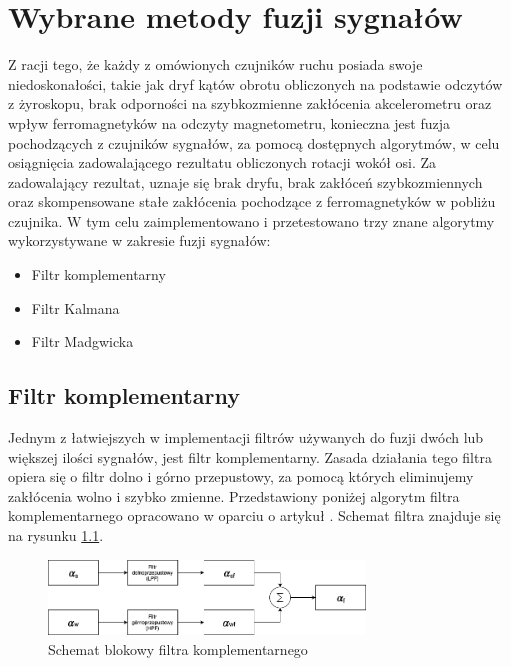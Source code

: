 \chapter{Wybrane metody fuzji sygnałów}
\label{chap:wybrane}

Z racji tego, że każdy z omówionych czujników ruchu posiada swoje niedoskonałości, takie jak dryf kątów obrotu obliczonych na podstawie odczytów z żyroskopu, brak odporności na szybkozmienne zakłócenia akcelerometru oraz wpływ ferromagnetyków na odczyty magnetometru, konieczna jest fuzja pochodzących z czujników sygnałów, za pomocą dostępnych algorytmów, w celu osiągnięcia zadowalającego rezultatu obliczonych rotacji wokół osi. Za zadowalający rezultat, uznaje się brak dryfu, brak zakłóceń szybkozmiennych oraz skompensowane stałe zakłócenia pochodzące z ferromagnetyków w pobliżu czujnika. W tym celu zaimplementowano i przetestowano trzy znane algorytmy wykorzystywane w zakresie fuzji sygnałów:
\begin{itemize}
    \item Filtr komplementarny
    \item Filtr Kalmana
    \item Filtr Madgwicka
\end{itemize}

\section{Filtr komplementarny}

Jednym z łatwiejszych w implementacji filtrów używanych do fuzji dwóch lub większej ilości sygnałów, jest filtr komplementarny. Zasada działania tego filtra opiera się o filtr dolno i górno przepustowy, za pomocą których eliminujemy zakłócenia wolno i szybko zmienne. Przedstawiony poniżej algorytm filtra komplementarnego opracowano w oparciu o artykuł \cite{Komplementarny2}. Schemat filtra znajduje się na rysunku \ref{filtr komplementarny}.

\begin{figure}[h!]
    \centering
    \includegraphics[width=0.75\textwidth]{Rysunki/Rozdzial04/Filtr_komplementarny.png}
    \caption{Schemat blokowy filtra komplementarnego}
    \label{filtr komplementarny}
\end{figure}

